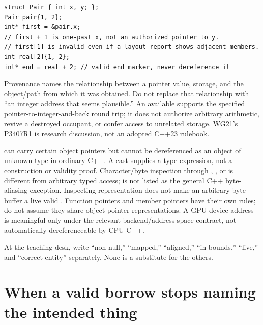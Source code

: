 \begin{verbatim}
struct Pair { int x, y; };
Pair pair{1, 2};
int* first = &pair.x;
// first + 1 is one-past x, not an authorized pointer to y.
// first[1] is invalid even if a layout report shows adjacent members.
int real[2]{1, 2};
int* end = real + 2; // valid end marker, never dereference it
\end{verbatim}

\hyperref[appendix-6af5921bc853]{Provenance} names the relationship between a pointer value, storage, and the object/path from which it was obtained. Do not replace that relationship with ``an integer address that seems plausible.'' An available  supports the specified pointer-to-integer-and-back round trip; it does not authorize arbitrary arithmetic, revive a destroyed occupant, or confer access to unrelated storage. WG21's \href{https://www.open-std.org/jtc1/sc22/wg21/docs/papers/2025/p3407r1.html}{P3407R1} is research discussion, not an adopted C++23 rulebook.

 can carry certain object pointers but cannot be dereferenced as an object of unknown type in ordinary C++. A cast supplies a type expression, not a construction or validity proof. Character/byte inspection through , , or  is different from arbitrary typed access;  is not listed as the general C++ byte-aliasing exception. Inspecting representation does not make an arbitrary byte buffer a live valid . Function pointers and member pointers have their own rules; do not assume they share object-pointer representations. A GPU device address is meaningful only under the relevant backend/address-space contract, not automatically dereferenceable by CPU C++.

At the teaching desk, write ``non-null,'' ``mapped,'' ``aligned,'' ``in bounds,'' ``live,'' and ``correct entity'' separately. None is a substitute for the others.

\section{When a valid borrow stops naming the intended thing}\label{01-foundations-i-ch003-when-a-valid-borrow-stops-naming-the-intended-thing}

